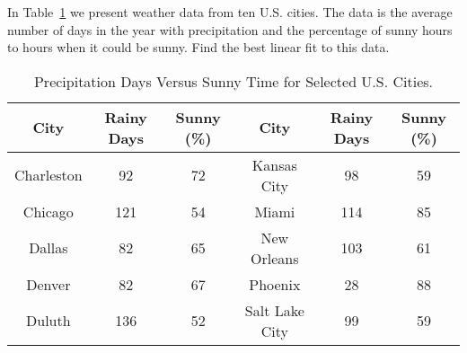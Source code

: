 \documentclass{ximera}
\begin{document}
\begin{exercise} \label{c7.6.3}
In Table~\ref{T:sunny} we present weather data from ten U.S. cities.  The
data is the average number of days in the year with precipitation and the
percentage of sunny hours to hours when it could be sunny.  Find the best
linear fit to this data.
\begin{table}[htb]
\begin{center}
\begin{tabular}{|c||c|c||c||c|c|}
\hline
City & Rainy Days & Sunny (\%) & City & Rainy Days & Sunny (\%)\\
\hline
Charleston 	&   92 & 72 & Kansas City 	&   98 & 59\\
Chicago 	&  121 & 54 & Miami 		&  114 & 85 \\
Dallas 		&   82 & 65 & New Orleans 	&  103 & 61 \\
Denver 		&   82 & 67 & Phoenix 		&   28 & 88 \\
Duluth 		&  136 & 52 & Salt Lake City 	&   99 & 59 \\
\hline
\end{tabular}
\caption{Precipitation Days Versus Sunny Time for Selected U.S. Cities.}
\label{T:sunny}
\end{center}
\end{table}
\end{exercise}
\end{document}
